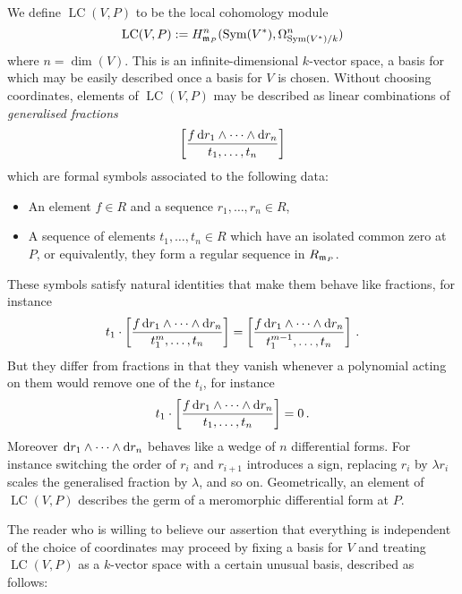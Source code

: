 \documentclass[english,letter paper,12pt,reqno]{article}
\theoremstyle{example}
\numberwithin{equation}{section}
\DeclareMathOperator{\Sym}{Sym}
\DeclareMathOperator{\LC}{LC}
\begin{document}
We define $\LC(V,P)$ to be the local cohomology module
\[
\LC(V,P) := H^n_{\mf{m}_P}(\Sym(V^*), \Omega^n_{\Sym(V^*)/k})
\]
where $n = \dim(V)$. This is an infinite-dimensional $k$-vector space, a basis for which may be easily described once a basis for $V$ is chosen. Without choosing coordinates, elements of $\LC(V,P)$ may be described as linear combinations of \emph{generalised fractions} \cite{Lipman84,Kunz08}
\[
\left[ \frac{f \operatorname{d}\!{r_1} \wedge \cdots \wedge \operatorname{d}\!{r_n}}{t_1, \ldots, t_n} \right]
\]
which are formal symbols associated to the following data:
\begin{itemize}
\item An element $f \in R$ and a sequence $r_1,\ldots,r_n \in R$,
\item A sequence of elements $t_1,\ldots,t_n \in R$ which have an isolated common zero at $P$, or equivalently, they form a regular sequence in $R_{\mathfrak{m}_P}$.
\end{itemize}
These symbols satisfy natural identities that make them behave like fractions, for instance
\[
t_1 \cdot \left[ \frac{f \operatorname{d}\!{r_1} \wedge \cdots \wedge \operatorname{d}\!{r_n}}{t_1^m, \ldots, t_n} \right] = \left[ \frac{f \operatorname{d}\!{r_1} \wedge \cdots \wedge \operatorname{d}\!{r_n}}{t_1^{m-1}, \ldots, t_n} \right]\,.
\]
But they differ from fractions in that they vanish whenever a polynomial acting on them would remove one of the $t_i$, for instance
\[
t_1 \cdot \left[ \frac{f \operatorname{d}\!{r_1} \wedge \cdots \wedge \operatorname{d}\!{r_n}}{t_1, \ldots, t_n} \right] = 0\,.
\]
Moreover $\operatorname{d}\!{r_1} \wedge \cdots \wedge \operatorname{d}\!{r_n}$ behaves like a wedge of $n$ differential forms. For instance switching the order of $r_i$ and $r_{i+1}$ introduces a sign, replacing $r_i$ by $\lambda r_i$ scales the generalised fraction by $\lambda$, and so on. Geometrically, an element of $\LC(V,P)$ describes the germ of a meromorphic differential form at $P$.

The reader who is willing to believe our assertion that everything is independent of the choice of coordinates may proceed by fixing a basis for $V$ and treating $\LC(V,P)$ as a $k$-vector space with a certain unusual basis, described as follows:
\end{document}
